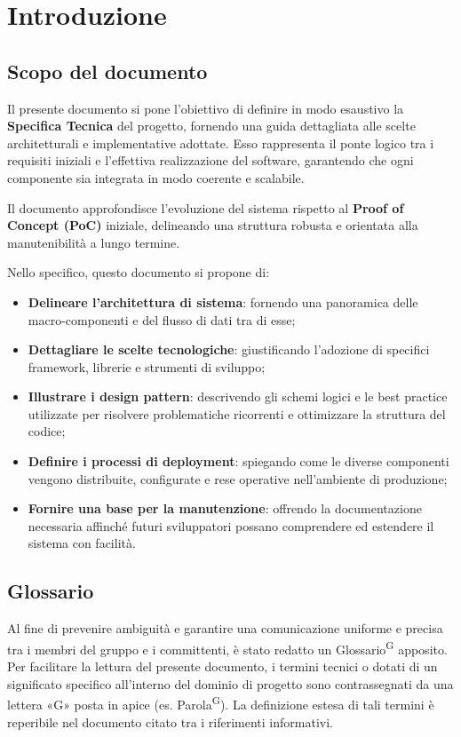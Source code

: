 \documentclass[a4paper, 11pt]{article}
\begin{document}
\pagestyle{fancy}
\newpage
\tableofcontents    %
\newpage
\listoffigures
\newpage



\section{Introduzione}
\subsection{Scopo del documento}
Il presente documento si pone l'obiettivo di definire in modo esaustivo la \textbf{Specifica Tecnica} del progetto, fornendo una guida dettagliata alle scelte architetturali e implementative adottate. Esso rappresenta il ponte logico tra i requisiti iniziali e l'effettiva realizzazione del software, garantendo che ogni componente sia integrata in modo coerente e scalabile.

Il documento approfondisce l'evoluzione del sistema rispetto al \textbf{Proof of Concept (PoC)} iniziale, delineando una struttura robusta e orientata alla manutenibilità a lungo termine.

Nello specifico, questo documento si propone di:
\begin{itemize}
  \item \textbf{Delineare l'architettura di sistema}: fornendo una panoramica delle macro-componenti e del flusso di dati tra di esse;
  \item \textbf{Dettagliare le scelte tecnologiche}: giustificando l'adozione di specifici framework, librerie e strumenti di sviluppo;
  \item \textbf{Illustrare i design pattern}: descrivendo gli schemi logici e le best practice utilizzate per risolvere problematiche ricorrenti e ottimizzare la struttura del codice;
  \item \textbf{Definire i processi di deployment}: spiegando come le diverse componenti vengono distribuite, configurate e rese operative nell'ambiente di produzione;
  \item \textbf{Fornire una base per la manutenzione}: offrendo la documentazione necessaria affinché futuri sviluppatori possano comprendere ed estendere il sistema con facilità.
\end{itemize}
\subsection{Glossario}
Al fine di prevenire ambiguità e garantire una comunicazione uniforme e precisa tra i membri del gruppo e i committenti, è stato redatto un Glossario\textsuperscript{G} apposito.
Per facilitare la lettura del presente documento, i termini tecnici o dotati di un significato specifico all'interno del dominio di progetto sono contrassegnati da una lettera «G» posta in apice (es. Parola\textsuperscript{G}).
La definizione estesa di tali termini è reperibile nel documento citato tra i riferimenti informativi.
\end{document}
